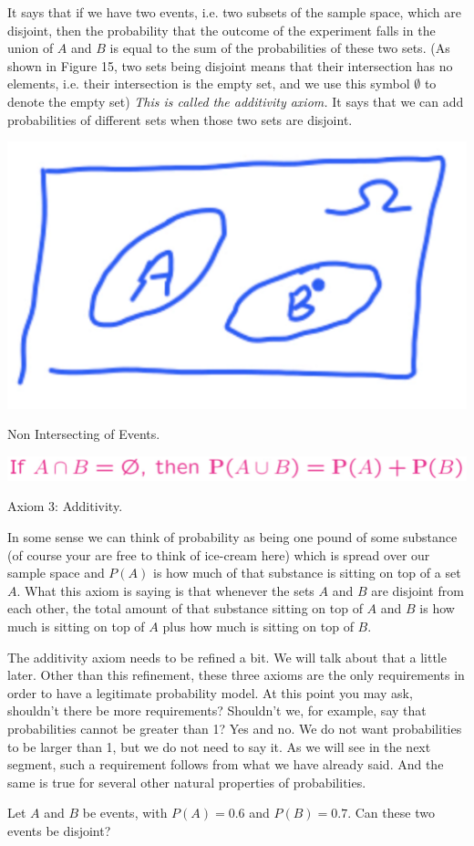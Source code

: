 \documentclass{tufte-handout}
\begin{document}
 It says that if we have two events, i.e. two subsets of the 
sample space, which are disjoint, then the probability that the outcome of the experiment falls
in the union of $A$ and $B$ is equal to the sum of
the probabilities of these two sets.
(As shown in Figure 15, two sets
being disjoint means that their intersection has no elements, i.e. their intersection is the empty set, and
we use this symbol $\emptyset$ to denote the empty set) \textit{This is called the additivity axiom.} It says that we can add
probabilities of different sets when those two sets are disjoint.

\begin{marginfigure}
  \includegraphics[width=\linewidth]{NonIntersecting}
  \caption{Non Intersecting of Events.}
\end{marginfigure}


\begin{marginfigure}[2cm]
  \includegraphics[width=\linewidth]{Axiom3}
  \caption{Axiom 3: Additivity.}
\end{marginfigure}

In some sense we can think of probability as being one pound of some substance (of course your are free to 
think of ice-cream here) which is spread over our sample space and $P(A)$ is how much of that substance 
is sitting on top of a set $A$. What this axiom is saying is that whenever the sets $A$ and $B$ are disjoint 
from each other, the total amount of that substance sitting on top of $A$ and $B$ is how much is sitting on 
top of $A$ plus how much is sitting on top of $B$. 

 The additivity axiom needs to be refined a bit. We will talk about that a little 
later. Other than this refinement, these three axioms are the only requirements in order to have a legitimate 
probability model. At this point you may ask, shouldn't there be more requirements? Shouldn't we, for example,
say that probabilities cannot be greater than 1? Yes and no. We do not want probabilities to be larger
than 1, but we do not need to say it. As we will see in the next segment, such a requirement follows
from what we have already said. And the same is true for several other natural properties of
probabilities.

 Let $A$ and $B$ be events, with $P(A)=0.6$ and $P(B)=0.7$. Can these two events be disjoint?

\vspace{0.5cm}
\end{document}
